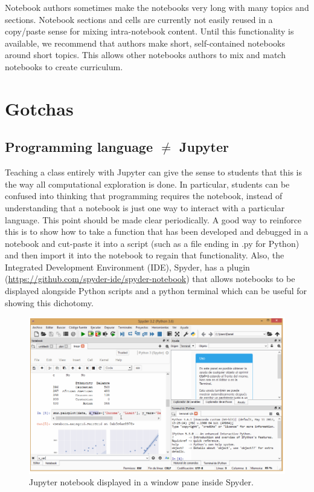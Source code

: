 \documentclass[]{book}
\begin{document}
Notebook authors sometimes make the notebooks very long with many topics
and sections. Notebook sections and cells are currently not easily
reused in a copy/paste sense for mixing intra-notebook content. Until
this functionality is available, we recommend that authors make short,
self-contained notebooks around short topics. This allows other
notebooks authors to mix and match notebooks to create curriculum.

\section{Gotchas}\label{gotchas}

\subsection{\texorpdfstring{Programming language \(\neq\)
Jupyter}{Programming language \textbackslash{}neq Jupyter}}\label{programming-language-neq-jupyter}

Teaching a class entirely with Jupyter can give the sense to students
that this is the way all computational exploration is done. In
particular, students can be confused into thinking that programming
requires the notebook, instead of understanding that a notebook is just
one way to interact with a particular language. This point should be
made clear periodically. A good way to reinforce this is to show how to
take a function that has been developed and debugged in a notebook and
cut-paste it into a script (such as a file ending in .py for Python) and
then import it into the notebook to regain that functionality. Also, the
Integrated Development Environment (IDE), Spyder, has a plugin
(\url{https://github.com/spyder-ide/spyder-notebook}) that allows
notebooks to be displayed alongside Python scripts and a python terminal
which can be useful for showing this dichotomy.

\begin{figure}
\centering
\includegraphics{images/chapter54.png}
\caption{Jupyter notebook displayed in a window pane inside Spyder.}
\end{figure}
\end{document}
